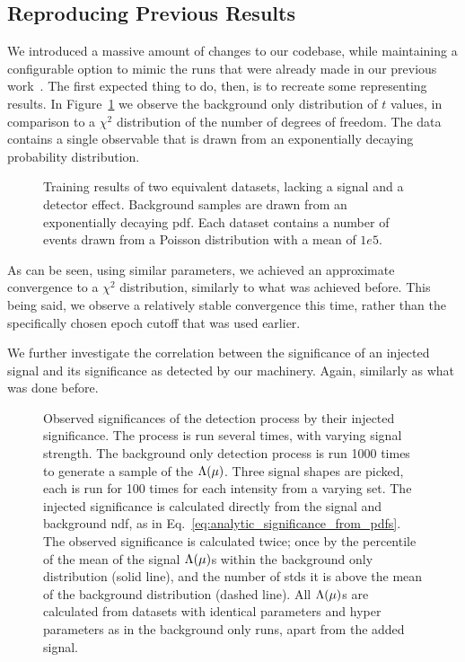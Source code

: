\documentclass[paper/ddppaper2.tex]{subfiles}
\begin{document}
\subsection{Reproducing Previous Results}
\label{sec:reproduction}

We introduced a massive amount of changes to our codebase, while maintaining a configurable option to mimic the runs that were already made in our previous work~\cite{LastDDPPaper}. The first expected thing to do, then, is to recreate some representing results.
In Figure~\ref{fig:t_distribution_plot_reproduction} we observe the background only distribution of $t$ values, in comparison to a $\chi^2$ distribution of the number of degrees of freedom. The data contains a single observable that is drawn from an exponentially decaying probability distribution.

\begin{figure}
    \caption{Training results of two equivalent datasets, lacking a signal and a detector effect. Background samples are drawn from an exponentially decaying \gls{pdf}. Each dataset contains a number of events drawn from a Poisson distribution with a mean of $1e5$.}
    \label{fig:t_distribution_plot_reproduction}
\end{figure}

As can be seen, using similar parameters, we achieved an approximate convergence to a $\chi^2$ distribution, similarly to what was achieved before. This being said, we observe a relatively stable convergence this time, rather than the specifically chosen epoch cutoff that was used earlier.

We further investigate the correlation between the significance of an injected signal and its significance as detected by our machinery. Again, similarly as what was done before.

\begin{figure}
    \caption{Observed significances of the detection process by their injected significance. The process is run several times, with varying signal strength. The background only detection process is run 1000 times to generate a sample of the $\Lambda({\mu})$. Three signal shapes are picked, each is run for 100 times for each intensity from a varying set. The injected significance is calculated directly from the signal and background \gls{ndf}, as in Eq.~\ref{eq:analytic_significance_from_pdfs}. The observed significance is calculated twice; once by the percentile of the mean of the signal $\Lambda({\mu})$s within the background only distribution (solid line), and the number of \glspl{std} it is above the mean of the background distribution (dashed line). All $\Lambda({\mu})$s are calculated from datasets with identical parameters and hyper parameters as in the background only runs, apart from the added signal.}
    \label{fig:observed_vs_injected_significances}
\end{figure}
\end{document}
